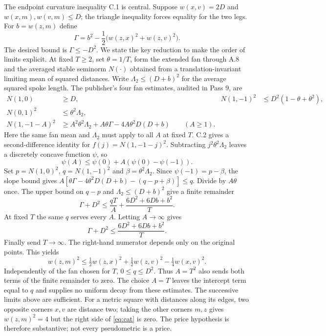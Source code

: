 \documentclass[11pt,letterpaper]{article}
\theoremstyle{definition}\newtheorem{definition}[theorem]{Definition}\newtheorem{example}[theorem]{Example}
\theoremstyle{remark}\newtheorem{remark}[theorem]{Remark}
\begin{document}
The endpoint curvature inequality C.1 is central. Suppose $w(x,v)=2D$ and $w(x,m),w(v,m)\le D$; the triangle inequality forces equality for the two legs. For $b=w(z,m)$ define
\[
 \Gamma=b^2-\frac12\bigl(w(z,x)^2+w(z,v)^2\bigr).
\]
The desired bound is $\Gamma\le-D^2$. We state the key reduction to make the order of limits explicit. At fixed $T\ge2$, set $\theta=1/T$, form the extended fan through A.8 and the averaged stable seminorm $N(\cdot)$ obtained from a translation-invariant limiting mean of squared distances. Write $\Lambda_2\le(D+b)^2$ for the average squared spoke length. The publisher's four fan estimates, audited in Pass 9, are
\begin{align*}
 N(1,0)&\ge D, &N(1,-1)^2&\le D^2(1-\theta+\theta^2),\\
 N(0,1)^2&\le\theta^2\Lambda_2,\\
 N(1,-1-A)^2&\ge A^2\theta^2\Lambda_2+A\theta\Gamma-4A\theta^2D(D+b)
 \qquad (A\ge1).
\end{align*}
Here the same fan mean and $\Lambda_2$ must apply to all $A$ at fixed $T$. C.2 gives a second-difference identity for $f(j)=N(1,-1-j)^2$. Subtracting $j^2\theta^2\Lambda_2$ leaves a discretely concave function $\psi$, so
\[
 \psi(A)\le\psi(0)+A(\psi(0)-\psi(-1)).
\]
Set $p=N(1,0)^2$, $q=N(1,-1)^2$ and $\beta=\theta^2\Lambda_2$.
Since $\psi(-1)=p-\beta$, the slope bound gives
$A[\theta\Gamma-4\theta^2D(D+b)-(q-p+\beta)]\le q$.
Divide by $A\theta$ once. The upper bound on $q-p$ and
$\Lambda_2\le(D+b)^2$ give a finite remainder
\[
 \Gamma+D^2 \le \frac{qT}{A}+\frac{6D^2+6Db+b^2}{T}.
\]
At fixed $T$ the same $q$ serves every $A$. Letting $A\to\infty$ gives
\[
 \Gamma+D^2\le \frac{6D^2+6Db+b^2}{T}.
\]
Finally send $T\to\infty$. The right-hand numerator depends only on the original points. This yields
\begin{equation}\label{eq:cat}
 w(z,m)^2\le \tfrac12 w(z,x)^2+\tfrac12 w(z,v)^2-\tfrac14 w(x,v)^2.
\end{equation}
Independently of the fan chosen for $T$, $0\le q\le D^2$. Thus $A=T^2$ also sends both terms of the finite remainder to zero. The choice $A=T$ leaves the intercept term equal to $q$ and supplies no uniform decay from these estimates. The successive limits above are sufficient. For a metric square with distances along its edges, two opposite corners $x,v$ are distance two; taking the other corners $m,z$ gives $w(z,m)^2=4$ but the right side of \eqref{eq:cat} is zero. The price hypothesis is therefore substantive; not every pseudometric is a price.
\end{document}
